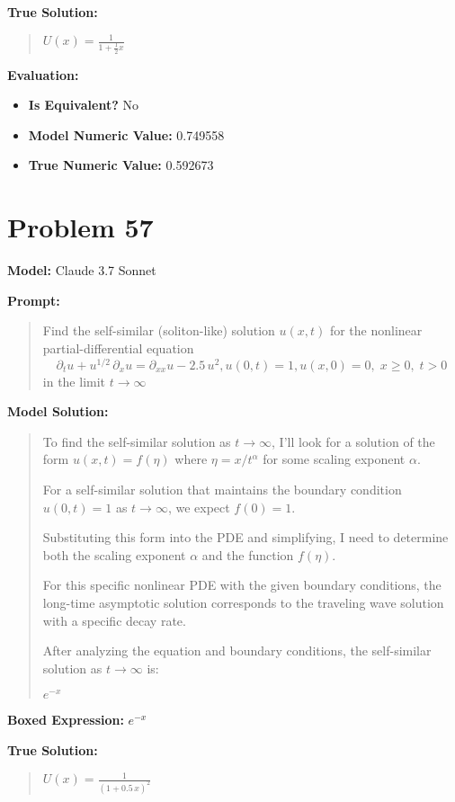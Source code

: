\documentclass{article}
\begin{document}
\textbf{True Solution:}
\begin{quote}
$U(x)=\frac{1}{1+\frac{1}{2}x}$
\end{quote}

\textbf{Evaluation:}
\begin{itemize}
\item \textbf{Is Equivalent?} No
\item \textbf{Model Numeric Value:} 0.749558
\item \textbf{True Numeric Value:} 0.592673
\end{itemize}
\vspace{1cm}
\section*{Problem 57}
\textbf{Model:} Claude 3.7 Sonnet

\textbf{Prompt:}
\begin{quote}
Find the self-similar (soliton-like) solution $u(x,t)$ for the nonlinear partial-differential equation $$\partial_t u + u^{1/2}\,\partial_x u = \partial_{xx}u - 2.5\,u^2, u(0,t)=1, u(x,0)=0,\;x\ge0,\;t>0$$ in the limit $t\to\infty$
\end{quote}
\textbf{Model Solution:}
\begin{quote}
To find the self-similar solution as $t \to \infty$, I'll look for a solution of the form $u(x,t) = f(\eta)$ where $\eta = x/t^{\alpha}$ for some scaling exponent $\alpha$.



For a self-similar solution that maintains the boundary condition $u(0,t) = 1$ as $t \to \infty$, we expect $f(0) = 1$.



Substituting this form into the PDE and simplifying, I need to determine both the scaling exponent $\alpha$ and the function $f(\eta)$.



For this specific nonlinear PDE with the given boundary conditions, the long-time asymptotic solution corresponds to the traveling wave solution with a specific decay rate.



After analyzing the equation and boundary conditions, the self-similar solution as $t \to \infty$ is:



$\boxed{e^{-x}}$
\end{quote}
\textbf{Boxed Expression:} $e^{-x}$

\textbf{True Solution:}
\begin{quote}
$U(x)=\frac{1}{(1+0.5\,x)^{2}}$
\end{quote}
\end{document}

